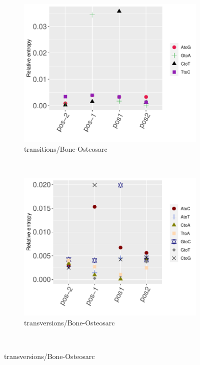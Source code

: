 \begin{figure}[ht!]
    \begin{subfigure}{.5\textwidth}
    \includegraphics[scale=0.63]{graphics/nbr_transitions_Bone-Osteosarc.pdf}
    \caption{transitions/Bone-Osteosarc}
    \label{fig:transitions_bone-osteosarc}
    \end{subfigure}
    ~
    \begin{subfigure}{.5\textwidth}
    \includegraphics[scale=0.63]{graphics/nbr_transversion_Bone-Osteosarc.pdf}
    \caption{transversions/Bone-Osteosarc}
    \label{fig:transversions_bone-osteosarc}
    \end{subfigure} \\
    \vspace{0.5cm}
    

\end{figure}
